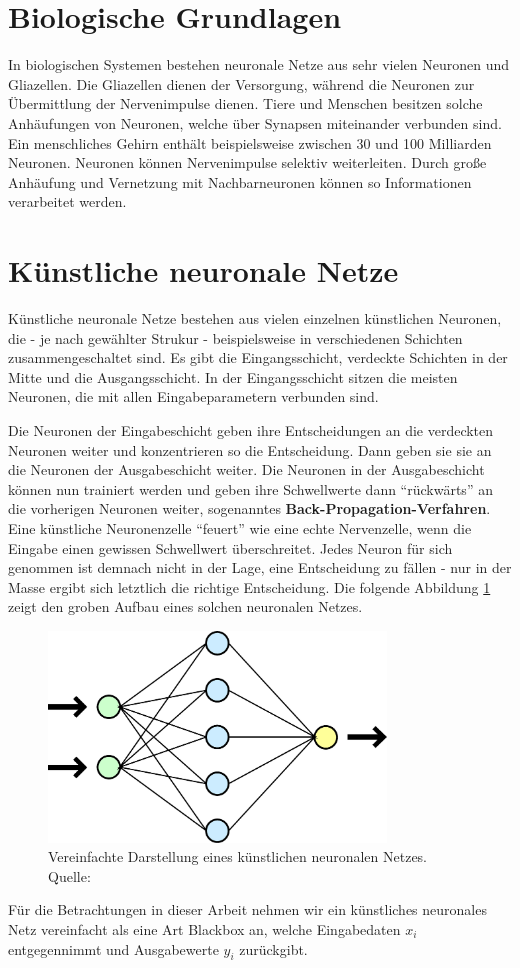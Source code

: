 \section{Biologische Grundlagen}
In biologischen Systemen bestehen neuronale Netze aus sehr vielen Neuronen und 
Gliazellen. Die Gliazellen dienen der Versorgung, während die Neuronen zur
Übermittlung der Nervenimpulse dienen. Tiere und Menschen besitzen solche Anhäufungen von 
Neuronen, welche über Synapsen miteinander verbunden sind. Ein menschliches 
Gehirn enthält beispielsweise zwischen 30 und 100 Milliarden Neuronen. Neuronen 
können Nervenimpulse selektiv weiterleiten. Durch große Anhäufung und 
Vernetzung mit Nachbarneuronen können so Informationen verarbeitet werden.

\section{Künstliche neuronale Netze}
Künstliche neuronale Netze bestehen aus vielen einzelnen künstlichen Neuronen, 
die - je nach gewählter Strukur - beispielsweise in verschiedenen Schichten
zusammengeschaltet sind. Es gibt die Eingangsschicht, verdeckte Schichten in
der Mitte und die Ausgangsschicht. In der Eingangsschicht sitzen die meisten
Neuronen, die mit allen Eingabeparametern verbunden sind.

Die Neuronen der Eingabeschicht geben ihre Entscheidungen an die verdeckten 
Neuronen weiter und konzentrieren so die Entscheidung. Dann geben sie sie an 
die Neuronen der Ausgabeschicht weiter. Die Neuronen in der Ausgabeschicht 
können nun trainiert werden und geben ihre Schwellwerte dann "`rückwärts"' an 
die vorherigen Neuronen weiter, sogenanntes \textbf{Back-Propagation-Verfahren}. Eine 
künstliche Neuronenzelle "`feuert"' wie eine echte Nervenzelle, wenn die 
Eingabe einen gewissen Schwellwert überschreitet. Jedes Neuron für sich 
genommen ist demnach nicht in der Lage, eine Entscheidung zu fällen - nur in 
der Masse ergibt sich letztlich die richtige Entscheidung. Die folgende 
Abbildung \ref{fig:Neuronales-Netz} zeigt den groben Aufbau eines solchen 
neuronalen Netzes.

\begin{figure}
  \centering
  \includegraphics[width=0.8\textwidth]{../images/neuralnetwork.eps}
  \caption{Vereinfachte Darstellung eines künstlichen neuronalen Netzes. 
  Quelle: \cite{wikipedia}}
  \label{fig:Neuronales-Netz}
\end{figure}

Für die Betrachtungen in dieser Arbeit nehmen wir ein künstliches neuronales
Netz vereinfacht als eine Art Blackbox an, welche Eingabedaten $x_i$
entgegennimmt und Ausgabewerte $y_i$ zurückgibt.